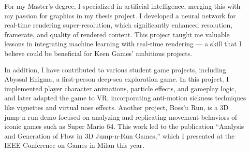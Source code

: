 For my Master’s degree, 
I specialized in artificial intelligence, 
merging this with my passion for graphics in my thesis project. 
I developed a neural network for real-time rendering super-resolution, 
which significantly enhanced resolution, framerate, and quality of rendered content. 
This project taught me valuable lessons in integrating machine learning with 
real-time rendering — a skill that I believe could be beneficial for Keen Games’ 
ambitious projects.

In addition, I have contributed to various student game projects, 
including Abyssal Enigma, a first-person deep-sea exploration game. 
In this project, I implemented player character animations, particle effects, 
and gameplay logic, and later adapted the game to VR, 
incorporating anti-motion sickness techniques like vignettes and virtual nose effects. 
Another project, Boss’n Run, is a 3D jump-n-run demo focused on analyzing and 
replicating movement behaviors of iconic games such as Super Mario 64. 
This work led to the publication “Analysis and Generation of Flow in 3D Jump-n-Run Games,”
 which I presented at the IEEE Conference on Games in Milan this year.